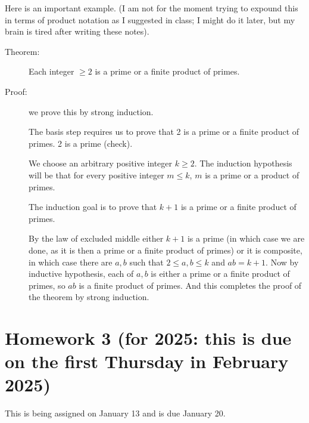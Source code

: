 \documentclass[12pt]{article}
\begin{document}
Here is an important example.  (I am not for the moment trying to expound this in terms of product notation as I suggested in class;  I might do it later, but my brain is tired after writing these notes).

\begin{description}

\item[Theorem:]  Each integer $\geq 2$ is a prime or a finite product of primes.

\item[Proof:]

we prove this by strong induction.

The basis step requires us to prove that 2 is a prime or a finite product of primes.  2 is a prime (check).

We choose an arbitrary positive integer $k\geq 2$.  The induction hypothesis will be that for every positive integer $m \leq k$, $m$ is a prime or a product of primes.

The induction goal is to prove that $k+1$ is a prime or a finite product of primes.

By the law of excluded middle either $k+1$ is a prime (in which case we are done, as it is then a prime or a finite product of primes)
or it is composite, in which case there are $a,b$ such that $2 \leq a,b \leq k$ and $ab=k+1$.  Now by inductive hypothesis, each of $a,b$ is either a prime or a finite product of primes, so $ab$ is a finite product of primes.  And this completes the proof of the theorem by strong induction.

\end{description}

\newpage

\section{Homework 3 (for 2025:  this is due on the first Thursday in February 2025)}

This is being assigned on January 13 and is due January 20.
\end{document}
